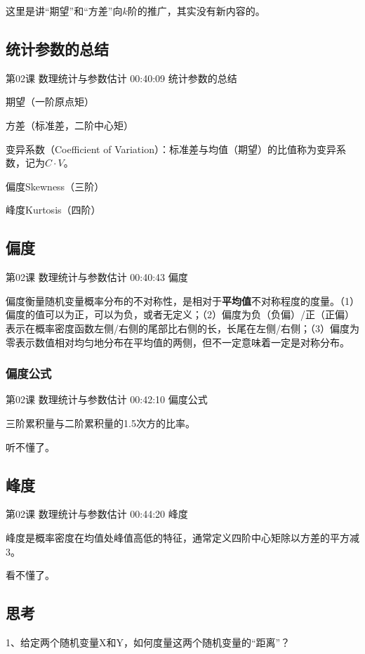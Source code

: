 \documentclass[UTF8]{ctexbook}
\begin{document}
这里是讲“期望”和“方差”向$k$阶的推广，其实没有新内容的。

\subsection{统计参数的总结}

第02课 数理统计与参数估计 00:40:09 统计参数的总结

期望（一阶原点矩）

方差（标准差，二阶中心矩）

变异系数（Coefficient of Variation）：标准差与均值（期望）的比值称为变异系数，记为$C \cdot V$。

偏度Skewness（三阶）

峰度Kurtosis（四阶）

\subsection{偏度}

第02课 数理统计与参数估计 00:40:43 偏度

偏度衡量随机变量概率分布的不对称性，是相对于\textbf{平均值}不对称程度的度量。（1）偏度的值可以为正，可以为负，或者无定义；（2）偏度为负（负偏）/正（正偏）表示在概率密度函数左侧/右侧的尾部比右侧的长，长尾在左侧/右侧；（3）偏度为零表示数值相对均匀地分布在平均值的两侧，但不一定意味着一定是对称分布。

\subsubsection{偏度公式}

第02课 数理统计与参数估计 00:42:10 偏度公式

三阶累积量与二阶累积量的1.5次方的比率。

听不懂了。

\subsection{峰度}

第02课 数理统计与参数估计 00:44:20 峰度

峰度是概率密度在均值处峰值高低的特征，通常定义四阶中心矩除以方差的平方减3。

看不懂了。

\subsection{思考}

1、给定两个随机变量X和Y，如何度量这两个随机变量的“距离”？
\end{document}
